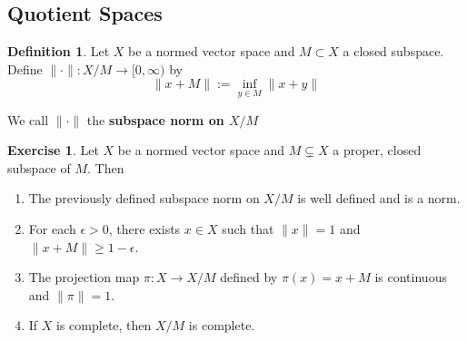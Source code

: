\documentclass[12pt]{amsart}
\theoremstyle{definition}
\newtheorem{defn}[definition]{Definition}
\newtheorem{ex}[definition]{Exercise}
\newcommand{\ep}{\epsilon}
\newcommand{\tbf}[1]{\textbf{#1}}
\newcommand{\Rg}{[0,\infty)}
\DeclareMathOperator*{\0}{\mbf{0}}
\DeclareMathOperator*{\1}{\mbf{1}}
\newcommand{\lex}[1]{\label{ex:#1}}
\newcommand{\ld}[1]{\label{defn:#1}}
\begin{document}
	
	
	
	
	
	
	
	
	
	
	
	
	
	
	
	
	
	
	
	
	
	\newpage
	\subsection{Quotient Spaces}	
	
	\begin{defn} \ld{}
		Let $X$ be a normed vector space and $M \subset X$ a closed subspace. Define $\|\cdot\|:X/M \rightarrow \Rg$ by $$\|x+M\| := \inf_{y \in M}\|x+y\|$$
		
		We call $\|\cdot\|$ the \tbf{subspace norm on $X/M$}
	\end{defn}
	
	\begin{ex} \lex{}
		Let $X$ be a normed vector space and $M \subsetneq X$ a proper, closed subspace of $M$. 
		Then 
		\begin{enumerate}
			\item The previously defined subspace norm on $X/M$ is well defined and is a norm. 
			\item For each $\ep > 0$, there exists $x \in X$ such that $\|x\|=1$ and $\|x+M\| \geq 1-\ep$.
			\item The projection map $\pi:X \rightarrow X/M$ defined by $\pi(x) = x+M$ is continuous and $\|\pi\|=1$. 
			\item If $X$ is complete, then $X/M$ is complete. 
		\end{enumerate} 
	\end{ex}
	
\end{document}
